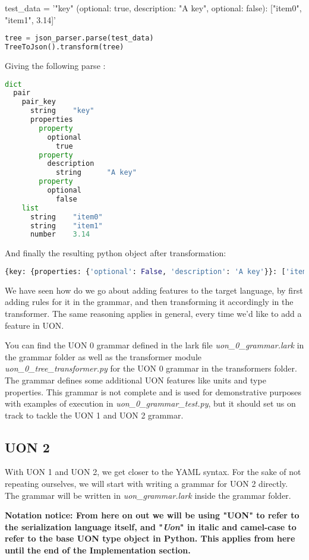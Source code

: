 \documentclass[12pt]{article}
\begin{document}
test\_data = '{"key" (optional: true, description: "A key", optional: false): ["item0", "item1", 3.14]}'
\begin{lstlisting}[language=Python]
tree = json_parser.parse(test_data)
TreeToJson().transform(tree)
\end{lstlisting}
Giving the following parse :
\begin{lstlisting}[language=Python]
dict
  pair
    pair_key
      string    "key"
      properties
        property
          optional
            true
        property
          description
            string      "A key"
        property
          optional
            false
    list
      string    "item0"
      string    "item1"
      number    3.14
\end{lstlisting}
And finally the resulting python object after transformation:
\begin{lstlisting}[language=Python]
{key: {properties: {'optional': False, 'description': 'A key'}}: ['item0', 'item1', 3.14]}
\end{lstlisting}

We have seen how do we go about adding features to the target language, by first adding rules for it in the grammar, and then transforming it accordingly in the transformer. The same reasoning applies in general, every time we'd like to add a feature in UON.

You can find the UON 0 grammar defined in the lark file \emph{uon\_0\_grammar.lark} in the grammar folder as well as the transformer module \emph{uon\_0\_tree\_transformer.py} for the UON 0 grammar in the transformers folder. The grammar defines some additional UON features like units and type properties. This grammar is not complete and is used for demonstrative purposes with examples of execution in \emph{uon\_0\_grammar\_test.py}, but it should set us on track to tackle the UON 1 and UON 2 grammar.

\pagebreak

\subsection{UON 2}
With UON 1 and UON 2, we get closer to the YAML syntax. For the sake of not repeating ourselves, we will start with writing a grammar for UON 2 directly. The grammar will be written in \emph{uon\_grammar.lark} inside the grammar folder.

\textbf{Notation notice: From here on out we will be using "UON" to refer to the serialization language itself, and "\emph{Uon}" in italic and camel-case to refer to the base UON type object in Python. This applies from here until the end of the Implementation section.}
\end{document}
